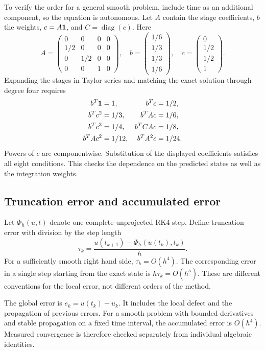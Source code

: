 To verify the order for a general smooth problem, include time as an additional component, so the equation is autonomous. Let \(A\) contain the stage coefficients, \(b\) the weights, \(c=A{\bf1}\), and \(C=\operatorname{diag}(c)\). Here
\[
A=\begin{pmatrix}
0&0&0&0\\
1/2&0&0&0\\
0&1/2&0&0\\
0&0&1&0
\end{pmatrix},
\quad
b=\begin{pmatrix}1/6\\1/3\\1/3\\1/6\end{pmatrix},
\quad
c=\begin{pmatrix}0\\1/2\\1/2\\1\end{pmatrix}.
\]
Expanding the stages in Taylor series and matching the exact solution through degree four requires
\[
\begin{aligned}
b^T{\bf1}&=1,&b^Tc&=1/2,\\
b^Tc^2&=1/3,&b^TAc&=1/6,\\
b^Tc^3&=1/4,&b^TCAc&=1/8,\\
b^TAc^2&=1/12,&b^TA^2c&=1/24.
\end{aligned}
\]
Powers of \(c\) are componentwise. Substitution of the displayed coefficients satisfies all eight conditions. This checks the dependence on the predicted states as well as the integration weights.

\subsection{Truncation error and accumulated error}
Let \(\Phi_h(u,t)\) denote one complete unprojected RK4 step. Define truncation error with division by the step length
\[
\tau_k=\frac{u(t_{k+1})-\Phi_h(u(t_k),t_k)}{h}.
\]
For a sufficiently smooth right hand side, \(\tau_k=O(h^4)\). The corresponding error in a single step starting from the exact state is \(h\tau_k=O(h^5)\). These are different conventions for the local error, not different orders of the method.

The global error is \(e_k=u(t_k)-u_k\). It includes the local defect and the propagation of previous errors. For a smooth problem with bounded derivatives and stable propagation on a fixed time interval, the accumulated error is \(O(h^4)\). Measured convergence is therefore checked separately from individual algebraic identities.

